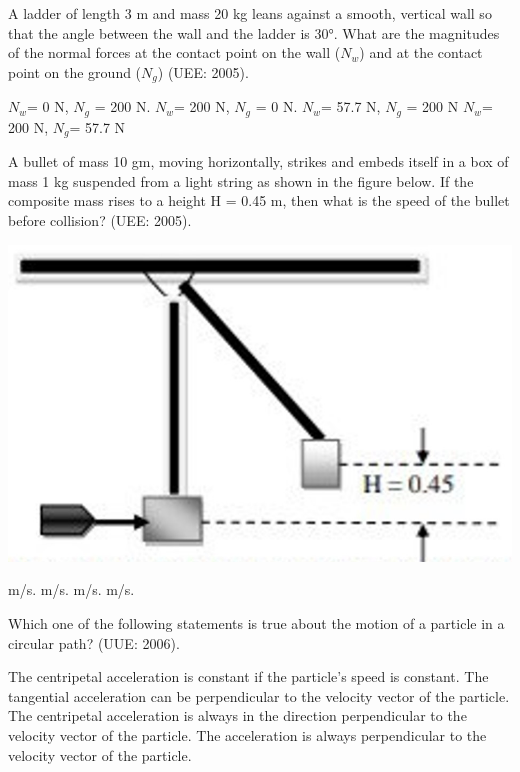 \documentclass[12pt,addpoints]{exam}
\begin{document}
\begin{questions}
					\question A ladder of length 3 m and mass 20 kg leans against a smooth, vertical wall so that the angle between the wall and the ladder is 30°. What are the magnitudes of the normal forces at the contact point on the wall ($N_{w}$) and at the contact point on the ground ($N_{g}$) (UEE: 2005).\\
					\begin{oneparchoices}
						\choice $N_{w}$= 0 N, $N_{g}$ = 200 N.
						\choice $N_{w}$= 200 N, $N_{g}$ = 0 N.
						\choice $N_{w}$= 57.7 N, $N_{g}$ = 200 N
						\choice $N_{w}$= 200 N, $N_{g}$= 57.7 N
						
					\end{oneparchoices} 
					
					\question A bullet of mass 10 gm, moving horizontally, strikes and embeds itself in a box of mass 1 kg suspended from a light string as shown in the figure below. If the composite mass rises to a height H = 0.45 m, then what is the speed of the bullet before collision? (UEE: 2005). \\
					\begin{center}
					    \includegraphics[scale=0.4]{Hpic.jpg}
					\end{center}
                        \begin{oneparchoices}
						\choice 303 m/s.
						\choice 300 m/s.
						\choice 90.9 m/s.
						\choice 90 m/s.
					\end{oneparchoices} 

					\question  Which one of the following statements is 
                      true about the motion of a particle in a circular 
                      path? (UUE: 2006).\\
					\begin{choices}
						\choice  The centripetal acceleration is constant if the particle's speed is constant.
						\choice The tangential acceleration can be perpendicular to the velocity vector of the particle.
						\choice The centripetal acceleration is always in the direction perpendicular to the velocity vector of the particle.
						\choice The acceleration is always perpendicular to the velocity vector of the particle.
						

\end{choices}
\end{questions}
\end{document}

